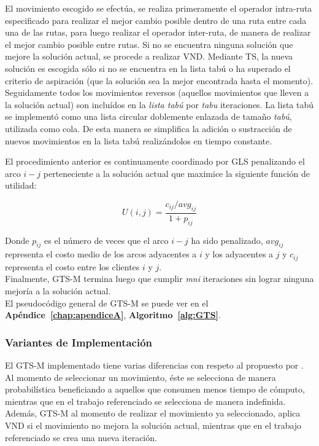 El movimiento escogido se efectúa, se realiza primeramente el operador intra-ruta especificado para realizar el mejor cambio posible dentro de una ruta entre cada una de las rutas, para luego realizar el operador inter-ruta, de manera de realizar el mejor cambio posible entre rutas. Si no se encuentra ninguna solución que mejore la solución actual, se procede a realizar VND.
Mediante TS, la nueva solución es escogida sólo si no se encuentra en la lista tabú o ha superado el criterio de aspiración (que la solución sea la mejor encontrada hasta el momento). Seguidamente todos los movimientos reversos (aquellos movimientos que lleven a la solución actual) son incluídos en la \emph{lista tabú} por \emph{tabu} iteraciones. La lista tabú se implementó como una lista circular doblemente enlazada de tamaño \emph{tabú}, utilizada como cola. De esta manera se simplifica la adición o sustracción de nuevos movimientos en la lista tabú realizándolos en tiempo constante.

El procedimiento anterior es continuamente coordinado por GLS penalizando el arco $i-j$ perteneciente a la solución actual que maximice la siguiente función de utilidad:

\begin{equation}
U(i,j) = \frac{c_{ij}/avg_{ij}}{1 + p_{ij}}
\end{equation}

Donde $p_{ij}$ es el número de veces que el arco $i-j$ ha sido penalizado, $avg_{ij}$ representa el costo medio de los arcos adyacentes a $i$ y los adyacentes a $j$ y $c_{ij}$ representa el costo entre los clientes $i$ y $j$.\\

Finalmente, GTS-M termina luego que cumplir \emph{mni} iteraciones sin lograr ninguna mejoría a la solución actual.\\

El pseudocódigo general de GTS-M se puede ver en el \textbf{Apéndice~\ref{chap:apendiceA}}, \textbf{Algoritmo~\ref{alg:GTS}}.

\subsubsection*{Variantes de Implementación}

El GTS-M implementado tiene varias diferencias con respeto al propuesto por \cite{gts}. Al momento de se\-leccio\-nar un movimiento, éste  se selecciona de manera probabilística beneficiando a aquellos que consumen menos tiempo de cómputo, mientras que en el trabajo referenciado se selecciona de manera indefinida. Además, GTS-M al momento de realizar el movimiento ya seleccionado, aplica VND si el movimiento no mejora la solución actual, mientras que en el trabajo referenciado se crea una nueva iteración.\\

